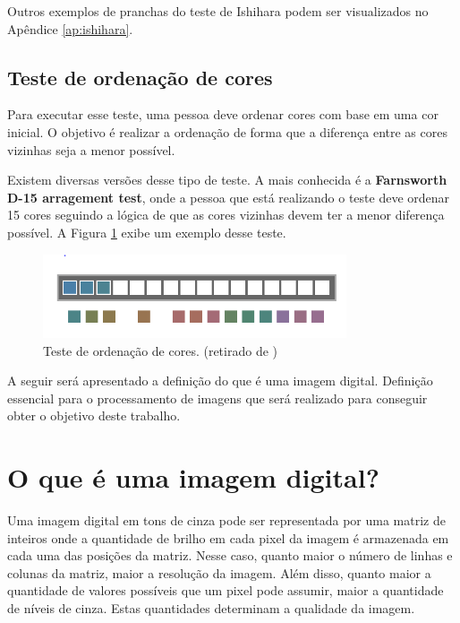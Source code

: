\documentclass[	12pt, Times, openright, twoside, a4paper, english, brazil]{abntex2}
\begin{document}
Outros exemplos de pranchas do teste de Ishihara podem ser visualizados no Apêndice \ref{ap:ishihara}.

\subsection{Teste de ordenação de cores}

Para executar esse teste, uma pessoa deve ordenar cores com base em uma cor inicial. O objetivo é realizar a ordenação de forma que a diferença entre as cores vizinhas seja a menor possível.

Existem diversas versões desse tipo de teste. A mais conhecida é a \textbf{Farnsworth D-15 arragement test}, onde a pessoa que está realizando o teste deve ordenar 15 cores seguindo a lógica de que as cores vizinhas devem ter a menor diferença possível. A Figura \ref{fig:figuraTesteOrdenacao} exibe um exemplo desse teste.

\begin{figure}[!htb]
\centering \includegraphics[width=0.8\textwidth]{figuraTesteOrdenacao.png}
\caption{Teste de ordenação de cores. (retirado de ) \label{fig:figuraTesteOrdenacao}}
\end{figure}

A seguir será apresentado a definição do que é uma imagem digital. Definição essencial para o processamento de imagens que será realizado para conseguir obter o objetivo deste trabalho.

\section{O que é uma imagem digital?}

Uma imagem digital em tons de cinza pode ser representada por uma matriz de inteiros onde a quantidade de brilho em cada pixel da imagem é armazenada em cada uma das posições da matriz. Nesse caso, quanto maior o número de linhas e colunas da matriz, maior a resolução da imagem. Além disso, quanto maior a quantidade de valores possíveis que um pixel pode assumir, maior a quantidade de níveis de cinza. Estas quantidades determinam a qualidade da imagem.
\end{document}
